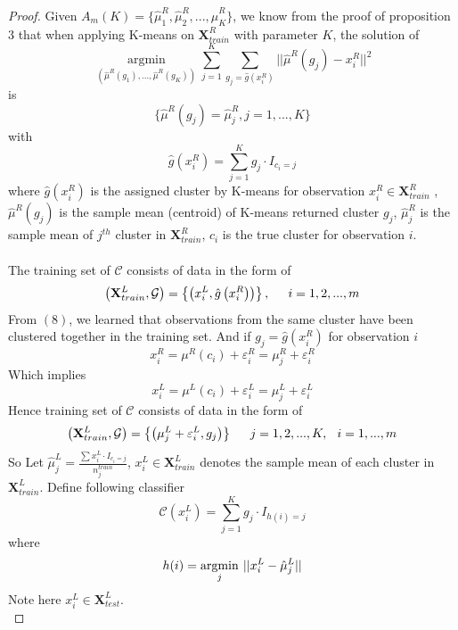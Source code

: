 \documentclass[11pt]{article}
\begin{document}
\begin{proof}
Given $A_m(K) = \{\hat{\mu}^R_1,\hat{\mu}^R_2,...,\hat{\mu}^R_K \}$,  we know from the proof of proposition $3$ that when applying K-means on $\mathbf{X}^R_{train}$ with parameter $K$, the solution of
\[ \underset{\left(\hat{\mu}^R\left(g_1\right),...,\hat{\mu}^R\left(g_K\right)\right)}{\operatorname{argmin}} \sum^K_{j=1} \sum_{g_j = \hat{g} \left(x^R_i\right)} ||\hat{\mu}^R \left(g_j\right) - x^R_i||^2 \]
is 
\begin{equation}
\{\hat{\mu}^R\left(g_j\right) = \hat{\mu}^R_{j}, j=1,...,K\}
\end{equation}
with 
\begin{equation}
\hat{g} \left(x^R_i\right) = \sum^K_{j=1} g_j \cdot I_{c_i = j}
\end{equation}
where $\hat{g} \left(x^R_i\right)$ is the assigned cluster by K-means for observation $x^R_i \in \mathbf{X}^R_{train}$  , $\hat{\mu}^R\left(g_j\right)$ is the sample mean (centroid) of K-means returned cluster $g_j$, $\hat{\mu}^R_{j}$ is the sample mean of $j^{th}$ cluster in $\mathbf{X}^R_{train}$, $c_i$ is the true cluster for observation $i$.\\\\
The training set of $\mathcal{C}$ consists of data in the form of 
\[
\left(\mathbf{X}^L_{train},\mathcal{G} \right) = \left\lbrace \left(x^L_i,\hat{g} \left(x^R_i\right)\right)\right\rbrace, \hspace{0.2in} i =1,2,...,m
 \]
From $(8)$, we learned that observations from the same cluster have been clustered together in the training set. 
And if $g_j = \hat{g} \left(x^R_i\right)$ for observation $i$
\[x^R_i = \mu^R \left(c_i\right) + \varepsilon^R_i = \mu^R_{j} + \varepsilon^R_i\] 
Which implies  
\[x^L_i = \mu^L \left(c_i\right) + \varepsilon^L_i = \mu^L_{j} + \varepsilon^L_i\] 
Hence training set of $\mathcal{C}$ consists of data in the form of 
\[ \left(\mathbf{X}^L_{train},\mathcal{G} \right) = \left\lbrace\left(\mu^L_{j} + \varepsilon^L_i, g_j \right)\right\rbrace\hspace{0.2in} j =1,2,...,K, \hspace{0.1in} i=1,...,m\]
So Let $\hat{\mu}^L_{j} = \frac{\sum x^L_i \cdot I_{c_i=j} }{n^{train}_j}$, $x^L_i  \in \mathbf{X}^L_{train}$ denotes the sample mean of each cluster in $\mathbf{X}^L_{train}$. Define following classifier
	 \[ \mathcal{C}(x^L_i) = \sum^K_{j=1} g_j \cdot I_{h(i) = j} \]
	 where\[h(i) = \underset{j}{\operatorname{argmin}} \hspace{0.05 in}||x^L_i - \hat{\mu}^L_j|| \]
	Note here $x^L_i  \in \mathbf{X}^L_{test}$.\\
	

\end{proof}
\end{document}
